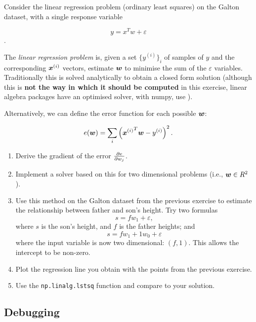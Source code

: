 \begin{exercise}
Consider the linear regression problem (ordinary least squares) on the Galton
dataset, with a single response variable

\[
y = x^T w + \varepsilon
\].

The \emph{linear regression problem} is, given a set $\{ y^{(i)} \}_i$ of
samples of $y$ and the corresponding $\bm{x}^{(i)}$ vectors, estimate
$\bm{w}$ to minimise the sum of the $\varepsilon$ variables. Traditionally
this is solved analytically to obtain a closed form solution (although this is
\textbf{not the way in which it should be computed} in this exercise, linear algebra packages
have an optimised solver, with numpy, use ).

Alternatively, we can define the error function for each possible $\bm{w}$:

\[
e(\bm{w}) = \sum_i \left( {\bm{x}^{(i)}}^T \bm{w} - y^{(i)} \right)^2.
\]

\begin{enumerate}
\item Derive the gradient of the error $\frac{\partial e}{\partial w_j}$.
\item Implement a solver based on this for two dimensional problems (i.e.,
$\bm{w} \in R^2$).
\item Use this method on the Galton dataset from the previous exercise to
estimate the relationship between father and son's height. Try two formulas
\begin{equation}
s = f w_1 + \varepsilon,
\label{}
\end{equation}
where $s$ is the son's height, and $f$ is the father heights; and
\begin{equation}
s = f w_1 + 1w_0 + \varepsilon
\label{}
\end{equation}
where the input variable is now two dimensional: $(f,1)$. This allows the
intercept to be non-zero.
\item Plot the regression line you obtain with the points from the previous
exercise.
\item Use the \texttt{np.linalg.lstsq} function and compare to your solution.
\end{enumerate}
\end{exercise}

\subsection{Debugging}


